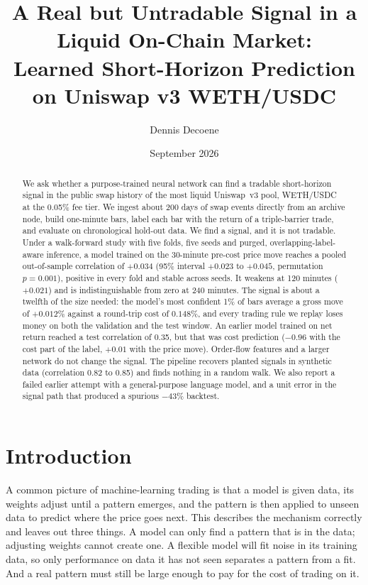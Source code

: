 \documentclass[11pt,a4paper]{article}
\title{A Real but Untradable Signal in a Liquid On-Chain Market:\\
Learned Short-Horizon Prediction\\
on Uniswap v3 WETH/USDC}
\author{Dennis Decoene}
\date{September 2026}
\begin{document}
\maketitle

\begin{abstract}
We ask whether a purpose-trained neural network can find a tradable
short-horizon signal in the public swap history of the most liquid Uniswap~v3
pool, WETH/USDC at the 0.05\% fee tier. We ingest about 200 days of swap
events directly from an archive node, build one-minute bars, label each bar
with the return of a triple-barrier trade, and evaluate on chronological
hold-out data. We find a signal, and it is not tradable. Under a walk-forward
study with five folds, five seeds and purged, overlapping-label-aware
inference, a model trained on the 30-minute pre-cost price move reaches a
pooled out-of-sample correlation of $+0.034$ (95\% interval $+0.023$ to
$+0.045$, permutation $p=0.001$), positive in every fold and stable across
seeds. It weakens at 120 minutes ($+0.021$) and is indistinguishable from
zero at 240 minutes. The signal is about a twelfth of the size needed: the
model's most confident 1\% of bars average a gross move of $+0.012\%$
against a round-trip cost of $0.148\%$, and every trading rule we replay
loses money on both the validation and the test window. An earlier model
trained on net return reached a test correlation of 0.35, but that was cost
prediction ($-0.96$ with the cost part of the label, $+0.01$ with the price
move). Order-flow features and a larger network do not change the signal. The
pipeline recovers planted signals in synthetic data (correlation 0.82 to
0.85) and finds nothing in a random walk. We also report a failed earlier
attempt with a general-purpose language model, and a unit error in the signal
path that produced a spurious $-43\%$ backtest.
\end{abstract}

\section{Introduction}

A common picture of machine-learning trading is that a model is given data,
its weights adjust until a pattern emerges, and the pattern is then applied to
unseen data to predict where the price goes next. This describes the mechanism
correctly and leaves out three things. A model can only find a pattern that is
in the data; adjusting weights cannot create one. A flexible model will fit
noise in its training data, so only performance on data it has not seen
separates a pattern from a fit. And a real pattern must still be large enough
to pay for the cost of trading on it.
\end{document}
